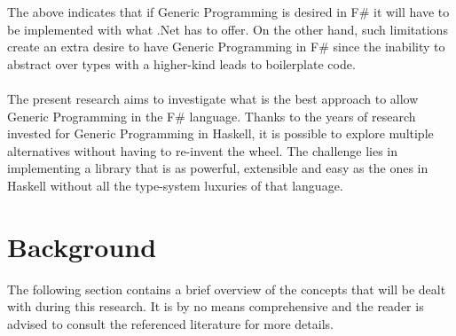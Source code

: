 \documentclass[8pt]{extarticle}
\begin{document}
The above indicates that if Generic Programming is desired in F\# it will have to be implemented with what .Net has to offer. On the other hand, such limitations create an extra desire to have Generic Programming in F\# since the inability to abstract over types with a higher-kind leads to boilerplate code.
\\\\
The present research aims to investigate what is the best approach to allow Generic Programming in the F\# language. Thanks to the years of research invested for Generic Programming in Haskell, it is possible to explore multiple alternatives without having to re-invent the wheel. The challenge lies in implementing a library that is as powerful, extensible and easy as the ones in Haskell without all the type-system luxuries of that language.
\section{Background}
The following section contains a brief overview of the concepts that will be dealt with during this research. It is by no means comprehensive and the reader is advised to consult the referenced literature for more details.
\end{document}
